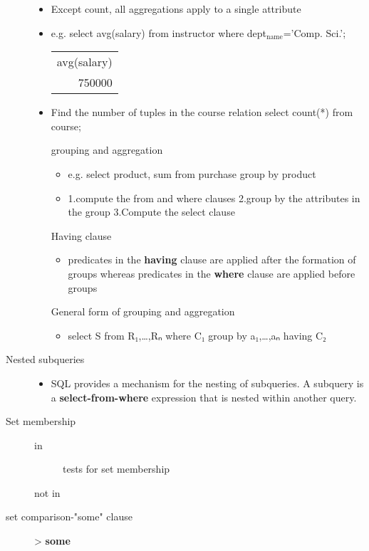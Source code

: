 \documentclass[11pt]{article}
\begin{document}
\begin{description}
\begin{itemize}
\item Except count, all aggregations apply to a single attribute
\item e.g. select avg(salary) from instructor where dept$_{\text{name}}$='Comp. Sci.';
\begin{center}
\begin{tabular}{r}
avg(salary)\\
750000\\
\end{tabular}
\end{center}
\item Find the number of tuples in the course relation
select count(*) from course;
\item[{grouping and aggregation}] \begin{itemize}
\item e.g. select product, sum from purchase group by product
\item 1.compute the from and where clauses
2.group by the attributes in the group
3.Compute the select clause
\end{itemize}
\item[{Having clause}] \begin{itemize}
\item predicates in the \textbf{having} clause are applied after the formation of groups
whereas predicates in the \textbf{where} clause are applied before groups
\end{itemize}
\item[{General form of grouping and aggregation}] \begin{itemize}
\item select S from R₁,\ldots{},Rₙ where C₁ group by a₁,\ldots{},aₙ having C₂
\end{itemize}
\end{itemize}
\item[{Nested subqueries}] \begin{itemize}
\item SQL provides a mechanism for the nesting of subqueries. A subquery is
a \textbf{select-from-where} expression that is nested within another query.
\end{itemize}
\item[{Set membership}] \begin{description}
\item[{in}] tests for set membership
\item[{not in}] 
\end{description}
\item[{set comparison-"some" clause}] > \textbf{some}

\end{description}
\end{document}
